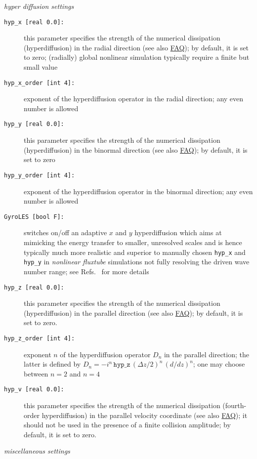 \documentclass[12pt]{article}
\begin{document}
%
{\em hyper diffusion settings}
\begin{description}
\item[\texttt{hyp\_x [real 0.0]:}] this parameter specifies the strength of the numerical dissipation
  (hyperdiffusion) in the radial direction (see also \hyperlink{hyp-advice}{FAQ}); by default, it is set to zero;
  (radially) global nonlinear simulation typically require a finite but small value
\item[\texttt{hyp\_x\_order [int 4]:}] exponent of the hyperdiffusion operator in the radial direction;
  any even number is allowed
\item[\texttt{hyp\_y [real 0.0]:}] this parameter specifies the strength of the numerical dissipation
  (hyperdiffusion) in the binormal direction (see also \hyperlink{hyp-advice}{FAQ}); by default, it is set to zero
\item[\texttt{hyp\_y\_order [int 4]:}] exponent of the hyperdiffusion operator in the binormal direction;
  any even number is allowed
\item[\hypertarget{gyroles}{\tt GyroLES [bool F]:}] switches on/off an adaptive $x$ and $y$ hyperdiffusion
 which aims at mimicking the energy transfer to smaller, unresolved scales and is hence typically much more
 realistic and superior to manually chosen {\tt hyp\_x} and {\tt hyp\_y} in {\em nonlinear fluxtube} simulations
 not fully resolving the driven wave number range;
 see Refs.~\cite{MorelPoP11, BanonPhD, BanonPoP14} for more details
\item[\hypertarget{hyp_z}{\tt hyp\_z [real 0.0]:}] this parameter specifies the strength of the numerical dissipation
  (hyperdiffusion) in the parallel direction\cite{diffusion} (see also \hyperlink{hyp-advice}{FAQ}); by default, it is set to zero.
\item[\texttt{hyp\_z\_order [int 4]:}] exponent $n$ of the hyperdiffusion operator $D_n$ in the parallel
  direction; the latter is defined by $D_n = - i^n\,\texttt{hyp\_z}\,(\Delta z/2)^n\,(d/dz)^n$; one may
  choose between $n=2$ and $n=4$
\item[\texttt{hyp\_v [real 0.0]:}] this parameter specifies the strength of the numerical dissipation
  (fourth-order hyperdiffusion) in the parallel velocity coordinate\cite{diffusion} (see also \hyperlink{hyp-advice}{FAQ});
  it should not be used in the presence of a finite collision amplitude; by default, it is set to zero.
\end{description}
%
{\em miscellaneous settings}
\end{document}
